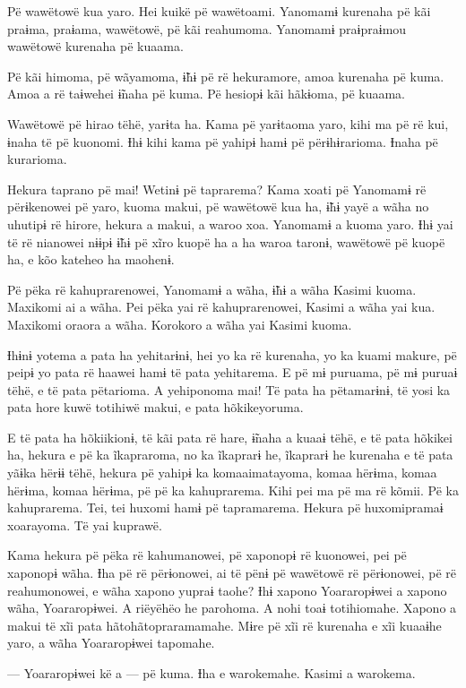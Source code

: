 Pë wawëtowë kua yaro. Hei kuikë pë wawëtoami. Yanomamɨ kurenaha pë kãi
praɨma, praɨama, wawëtowë, pë kãi reahumoma. Yanomamɨ praɨpraɨmou
wawëtowë kurenaha pë kuaama. 

Pë kãi himoma, pë wãyamoma, ɨ̃hɨ pë rë hekuramore, amoa kurenaha pë kuma.
Amoa a rë taɨwehei ɨ̃naha pë kuma. Pë hesiopɨ kãi hãkɨoma, pë kuaama. 

Wawëtowë pë hirao tëhë, yarɨta ha. Kama pë yarɨtaoma yaro, kihi ma pë rë
kui, ɨnaha të pë kuonomi. Ɨhɨ kihi kama pë yahipɨ hamɨ pë përɨhɨrarioma.
Ɨnaha pë kurarioma. 

Hekura taprano pë mai! Wetinɨ pë taprarema? Kama xoati pë Yanomamɨ rë
përɨkenowei pë yaro, kuoma makui, pë wawëtowë kua ha, ɨ̃hɨ yayë a wãha no
uhutipɨ rë hirore, hekura a makui, a waroo xoa. Yanomamɨ a kuoma yaro.
Ɨhɨ yai të rë nianowei nɨɨpɨ ɨ̃hɨ pë xĩro kuopë ha a ha waroa taronɨ,
wawëtowë pë kuopë ha, e kõo kateheo ha maohenɨ. 

Pë pëka rë kahuprarenowei, Yanomamɨ a wãha, ɨ̃hɨ a wãha Kasimi kuoma.
Maxikomi ai a wãha. Pei pëka yai rë kahuprarenowei, Kasimi a wãha yai
kua. Maxikomi oraora a wãha. Korokoro a wãha yai Kasimi kuoma. 

Ɨhɨnɨ yotema a pata ha yehitarɨnɨ, hei yo ka rë kurenaha, yo ka kuami
makure, pë peipɨ yo pata rë haawei hamɨ të pata yehitarema. E pë mɨ
puruama, pë mɨ puruaɨ tëhë, e të pata pëtarioma. A yehiponoma mai! Të
pata ha pëtamarɨnɨ, të yosi ka pata hore kuwë totihiwë makui, e pata
hõkikeyoruma. 

E të pata ha hõkiikionɨ, të kãi pata rë hare, ɨ̃naha a kuaaɨ tëhë, e të
pata hõkikei ha, hekura e pë ka ĩkapraroma, no ka ĩkaprarɨ he, ĩkaprarɨ
he kurenaha e të pata yãɨka hërɨɨ tëhë, hekura pë yahipɨ ka
komaaimatayoma, komaa hërɨma, komaa hërɨma, komaa hërɨma, pë pë ka
kahuprarema. Kihi pei ma pë ma rë kõmii. Pë ka kahuprarema. Tei, tei
huxomi hamɨ pë tapramarema. Hekura pë huxomipramaɨ xoarayoma. Të yai
kuprawë. 

Kama hekura pë pëka rë kahumanowei, pë xaponopɨ rë kuonowei, pei pë
xaponopɨ wãha. Ɨha pë rë përɨonowei, ai të pënɨ pë wawëtowë rë
përɨonowei, pë rë reahumonowei, e wãha xapono yupraɨ taohe? Ɨhɨ xapono
Yoararopɨwei a xapono wãha, Yoararopɨwei. A riëyëhëo he parohoma. A nohi
toaɨ totihiomahe. Xapono a makui të xĩi pata hãtohãtopraramamahe. Mɨre
pë xĩi rë kurenaha e xĩi kuaaɨhe yaro, a wãha Yoararopɨwei tapomahe. 

 

--- Yoararopɨwei kë a --- pë kuma. Ɨha e warokemahe. Kasimi a warokema. 


